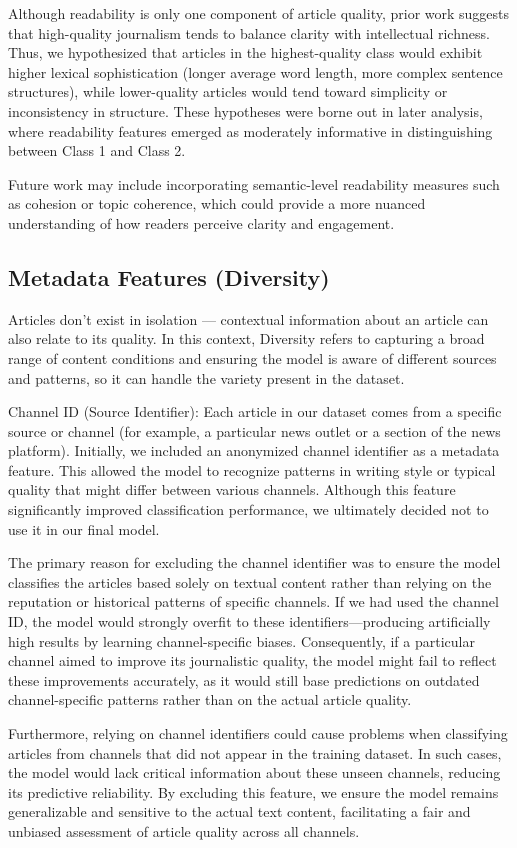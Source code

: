 Although readability is only one component of article quality, prior work suggests that high-quality journalism tends to balance clarity with intellectual richness. Thus, we hypothesized that articles in the highest-quality class would exhibit higher lexical sophistication (longer average word length, more complex sentence structures), while lower-quality articles would tend toward simplicity or inconsistency in structure. These hypotheses were borne out in later analysis, where readability features emerged as moderately informative in distinguishing between \ac{Class 1} and \ac{Class 2}.

Future work may include incorporating semantic-level readability measures such as cohesion or topic coherence, which could provide a more nuanced understanding of how readers perceive clarity and engagement.

\subsection{Metadata Features (Diversity)}
Articles don’t exist in isolation — contextual information about an article can also relate to its quality. In this context, Diversity refers to capturing a broad range of content conditions and ensuring the model is aware of different sources and patterns, so it can handle the variety present in the dataset.

Channel ID (Source Identifier): Each article in our dataset comes from a specific source or channel (for example, a particular news outlet or a section of the news platform). Initially, we included an anonymized channel identifier as a metadata feature. This allowed the model to recognize patterns in writing style or typical quality that might differ between various channels. Although this feature significantly improved classification performance, we ultimately decided not to use it in our final model.

The primary reason for excluding the channel identifier was to ensure the model classifies the articles based solely on textual content rather than relying on the reputation or historical patterns of specific channels. If we had used the channel ID, the model would strongly overfit to these identifiers—producing artificially high results by learning channel-specific biases. Consequently, if a particular channel aimed to improve its journalistic quality, the model might fail to reflect these improvements accurately, as it would still base predictions on outdated channel-specific patterns rather than on the actual article quality.

Furthermore, relying on channel identifiers could cause problems when classifying articles from channels that did not appear in the training dataset. In such cases, the model would lack critical information about these unseen channels, reducing its predictive reliability. By excluding this feature, we ensure the model remains generalizable and sensitive to the actual text content, facilitating a fair and unbiased assessment of article quality across all channels.
